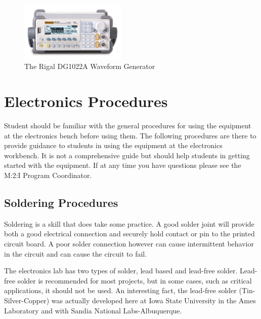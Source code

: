 \begin{figure}[ht]
\centering
\includegraphics[width=2in]{images/dg1022a.jpg}
\caption{The Rigal DG1022A Waveform Generator}
\label{fig:dg1022a}
\end{figure}

\chapter{Electronics Procedures}
Student should be familiar with the general procedures for using the equipment at the electronics bench before using them.  The following procedures are there to provide guidance to students in using the equipment at the electronics workbench.  It is not a comprehensive guide but should help students in getting started with the equipment.  If at any time you have questions please see the M:2:I Program Coordinator.

\section{Soldering Procedures}
Soldering is a skill that does take some practice.  A good solder joint will provide both a good electrical connection and securely hold contact or pin to the printed circuit board.  A poor solder connection however can cause intermittent behavior in the circuit and can cause the circuit to fail.

The electronics lab has two types of solder, lead based and lead-free solder.  Lead-free solder is recommended for most projects, but in some cases, such as critical applications, it should not be used.  An interesting fact, the lead-free solder (Tin-Silver-Copper) was actually developed here at Iowa State University in the Ames Laboratory and with Sandia National Labs-Albuquerque.

